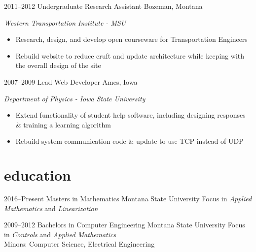 \documentclass[]{two-column-stats} %
\begin{document}
\begin{entrylist}
{}
\entry
{2011--2012}
{Undergraduate Research Assistant}
{Bozeman, Montana}
{\emph{Western Transportation Institute - MSU}
\begin{itemize}
\item Research, design, and develop open courseware for Transportation Engineers
\item Rebuild website to reduce cruft and update architecture while keeping with the overall design of the site
\end{itemize}
}
\entry
{2007--2009}
{Lead Web Developer}
{Ames, Iowa}
{\emph{Department of Physics - Iowa State University}
\begin{itemize}
\item Extend functionality of student help software, including designing responses \& training a learning algorithm
\item Rebuild system communication code \& update to use TCP instead of UDP
\end{itemize}
}
\end{entrylist}


\section{education}

\begin{entrylist}
\entry
{2016--Present}
{Masters {\normalfont in Mathematics}}
{Montana State University}
{Focus in \emph{Applied Mathematics} and \emph{Linearization}}
\end{entrylist}

\begin{entrylist}
\entry
{2009--2012}
{Bachelors {\normalfont in Computer Engineering}}
{Montana State University}
{Focus in \emph{Controls} and \emph{Applied Mathematics} \\
 Minors: Computer Science, Electrical Engineering}
\end{entrylist}
\end{document}
